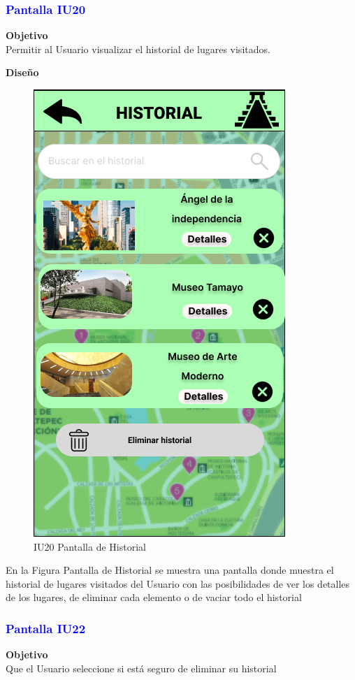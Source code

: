 \vspace{15pt}

\subsubsection{\textcolor{blue}{Pantalla IU20}}

\textbf{Objetivo} \\
Permitir al Usuario visualizar el historial de lugares visitados.
\vspace{15pt}

\textbf{Diseño}

    \begin{figure}[h]
        
            \centering
            \includegraphics[width=.4\linewidth]{Pantallas Prototipo3/IU20 Pantalla Historial.jpg}
            \caption{IU20 Pantalla de Historial}
    
    \end{figure}

En la Figura Pantalla de Historial se muestra una pantalla donde muestra el historial de lugares visitados del Usuario con las posibilidades de ver los detalles de los lugares, de eliminar cada elemento o de vaciar todo el historial

\subsubsection{\textcolor{blue}{Pantalla IU22}}

\textbf{Objetivo} \\
Que el Usuario seleccione si está seguro de eliminar su historial
\vspace{15pt}

